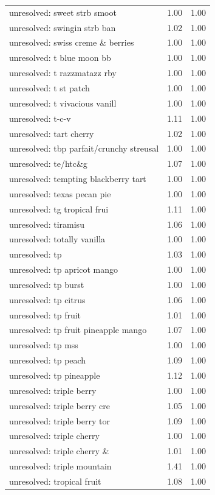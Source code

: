 \begin{table}
\begin{tabular}{lrr}
unresolved: sweet strb smoot & 1.00 & 1.00 \\
unresolved: swingin strb ban & 1.02 & 1.00 \\
unresolved: swiss creme \& berries & 1.00 & 1.00 \\
unresolved: t blue moon bb & 1.00 & 1.00 \\
unresolved: t razzmatazz rby & 1.00 & 1.00 \\
unresolved: t st patch & 1.00 & 1.00 \\
unresolved: t vivacious vanill & 1.00 & 1.00 \\
unresolved: t-c-v & 1.11 & 1.00 \\
unresolved: tart cherry & 1.02 & 1.00 \\
unresolved: tbp parfait/crunchy streusal & 1.00 & 1.00 \\
unresolved: te/htc\&g & 1.07 & 1.00 \\
unresolved: tempting blackberry tart & 1.00 & 1.00 \\
unresolved: texas pecan pie & 1.00 & 1.00 \\
unresolved: tg tropical frui & 1.11 & 1.00 \\
unresolved: tiramisu & 1.06 & 1.00 \\
unresolved: totally vanilla & 1.00 & 1.00 \\
unresolved: tp & 1.03 & 1.00 \\
unresolved: tp apricot mango & 1.00 & 1.00 \\
unresolved: tp burst & 1.00 & 1.00 \\
unresolved: tp citrus & 1.06 & 1.00 \\
unresolved: tp fruit & 1.01 & 1.00 \\
unresolved: tp fruit pineapple mango & 1.07 & 1.00 \\
unresolved: tp mss & 1.00 & 1.00 \\
unresolved: tp peach & 1.09 & 1.00 \\
unresolved: tp pineapple & 1.12 & 1.00 \\
unresolved: triple berry & 1.00 & 1.00 \\
unresolved: triple berry cre & 1.05 & 1.00 \\
unresolved: triple berry tor & 1.09 & 1.00 \\
unresolved: triple cherry & 1.00 & 1.00 \\
unresolved: triple cherry \& & 1.01 & 1.00 \\
unresolved: triple mountain & 1.41 & 1.00 \\
unresolved: tropical fruit & 1.08 & 1.00 \\

\end{tabular}
\end{table}
